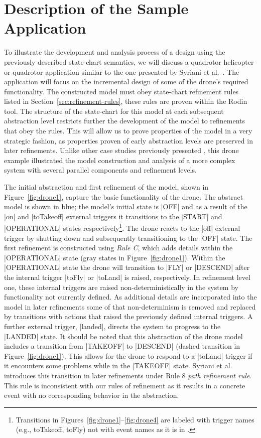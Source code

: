 \section{Description of the Sample Application}
\label{sec:descr-sample-appl}

To illustrate the development and analysis process of a design using the previously described 
state-chart semantics, we will discuss a quadrotor helicopter or quadrotor application similar to 
the one presented by Syriani et al.~\cite{Syriani_2019}. 
The application will focus on the incremental design of some of the drone's required functionality.
The constructed model must obey state-chart refinement rules listed in Section~\ref{sec:refinement-rules}, these rules are proven within the Rodin tool.
The structure of the state-chart for this model at each subsequent abstraction level restricts further the development of the model to refinements that obey the rules. 
This will allow us to prove properties of the model in a very strategic fashion, as properties proven of early abstraction levels are preserved in later refinements.
Unlike other case studies previously presented \cite{MoSn16,MoSnHo18,MoSnHo-ABZ2020}, this drone example
illustrated the model construction and analysis of a more complex system with several parallel components 
and refinement levels. 

The initial abstraction and first refinement of the model, shown in Figure~\ref{fig:drone1}, capture the basic functionality of the drone. 
The abstract model is shown in blue; the model's initial state is |OFF| and as a result of the |on| and  |toTakeoff| external triggers it transitions to the |START| and |OPERATIONAL| states respectively\footnote{Transitions in Figures~\ref{fig:drone1}--\ref{fig:drone4} are labeled with trigger names
(e.g., toTakeoff, toFly) not with event names as it is in \UMLB.}. 
The drone reacts to the |off| external trigger by shutting down and subsequently transitioning to the |OFF| state.
The first refinement is constructed using \emph{Rule C}, which adds details within the |OPERATIONAL| state (gray states in Figure~\ref{fig:drone1}).
Within the |OPERATIONAL| state the drone will transition to |FLY| or |DESCEND| after the internal trigger |toFly| or |toLand| is raised, respectively. 
In refinement level one, these internal triggers are raised non-deterministically in the system by functionality not currently defined.
As additional details are incorporated into the model in later refinements some of that non-determinism is 
removed and replaced by transitions with actions that raised the previously defined internal triggers.
A further external trigger, |landed|, directs the system to progress to the |LANDED| state.
It should be noted that this abstraction of the drone model includes a transition from |TAKEOFF| to |DESCEND| (dashed transition in Figure~\ref{fig:drone1}). 
This allows for the drone to respond to a |toLand| trigger if it encounters some problems while in the |TAKEOFF| state.
Syriani et al.~\cite{Syriani_2019} introduces this transition in later refinements under Rule 8 \emph{path refinement rule}. 
This rule is inconsistent with our rules of refinement as it results in a concrete event with no corresponding behavior in the abstraction.

